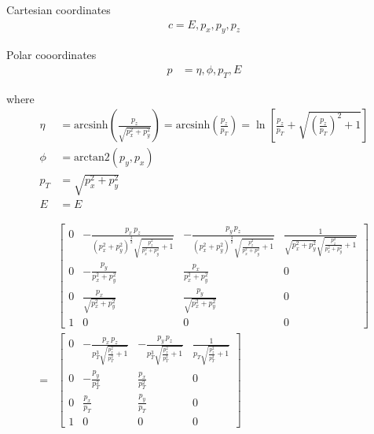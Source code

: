 \documentclass{article}
\begin{document}
Cartesian coordinates \begin{align*}
    c = E, p_x, p_y, p_z
\end{align*}

Polar cooordinates \begin{align*}
    p &= \eta, \phi, p_T, E
\end{align*}

where \begin{align*}
    \eta &= \text{arcsinh}\left(\frac{p_z}{\sqrt{p_x^2 + p_y^2}}\right) = \text{arcsinh} \left(\frac{p_z}{p_T} \right) = \ln \left[ \frac{p_z}{p_T} + \sqrt{\left(\frac{p_z}{p_T}\right)^2 + 1}\right]\\
    \phi &= \text{arctan2} (p_y, p_x)\\
    p_T &= \sqrt{p_x^2 + p_y^2}\\
    E &= E
\end{align*}


\begin{align*}
    &\left[
    \begin{matrix}
        0 & -\frac{p_x\, p_z}{\left(p_x^{2} + p_y^{2}\right)^{\frac{3}{2}} \sqrt{\frac{p_z^{2}}{p_x^{2} + p_y^{2}} + 1}} & -\frac{p_y\, p_z}{\left(p_x^{2} + p_y^{2}\right)^{\frac{3}{2}} \sqrt{\frac{p_z^{2}}{p_x^{2} + p_y^{2}} + 1}} & \frac{1}{\sqrt{p_x^{2} + p_y^{2}} \sqrt{\frac{p_z^{2}}{p_x^{2} + p_y^{2}} + 1}} \\
        0 & -\frac{p_y}{p_x^{2} + p_y^{2}} & \frac{p_x}{p_x^{2} + p_y^{2}} & 0 \\
        0 & \frac{p_x}{\sqrt{p_x^{2} + p_y^{2}}} & \frac{p_y}{\sqrt{p_x^{2} + p_y^{2}}} & 0 \\
        1 & 0 & 0 & 0
    \end{matrix}
    \right]\\
    =&\left[
    \begin{matrix}
        0 & -\frac{p_x\, p_z}{p_T^3 \sqrt{\frac{p_z^{2}}{p_T^2} + 1}} & -\frac{p_y\, p_z}{p_T^3 \sqrt{\frac{p_z^{2}}{p_T^2} + 1}} & \frac{1}{p_T \sqrt{\frac{p_z^{2}}{p_T^2} + 1}} \\
        0 & -\frac{p_y}{p_T^2} & \frac{p_x}{p_T^2} & 0 \\
        0 & \frac{p_x}{p_T} & \frac{p_y}{p_T} & 0 \\
        1 & 0 & 0 & 0
    \end{matrix}
    \right]\\
\end{align*}
\end{document}
